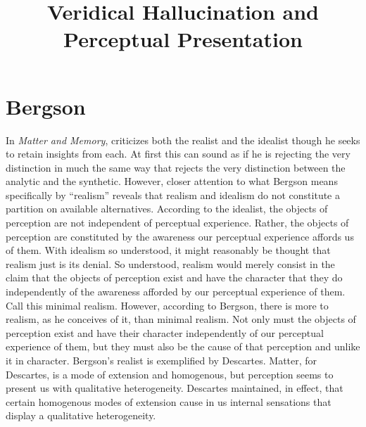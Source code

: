 \documentclass[12pt]{article}
\title{Veridical Hallucination and Perceptual Presentation}
\author{\myauthor}
\date{} %
\begin{document}
\maketitle

\setlength{\parindent}{1em}


\section{Bergson} %
\label{sec:bergson}

In \emph{Matter and Memory}, \citet{Bergson:1912pi} criticizes both the realist and the idealist though he seeks to retain insights from each. At first this can sound as if he is rejecting the very distinction in much the same way that \citet{Quine:1951fk} rejects the very distinction between the analytic and the synthetic. However, closer attention to what Bergson means specifically by ``realism'' reveals that realism and idealism do not constitute a partition on available alternatives. According to the idealist, the objects of perception are not independent of perceptual experience. Rather, the objects of perception are constituted by the awareness our perceptual experience affords us of them. With idealism so understood, it might reasonably be thought that realism just is its denial. So understood, realism would merely consist in the claim that the objects of perception exist and have the character that they do independently of the awareness afforded by our perceptual experience of them. Call this minimal realism. However, according to Bergson, there is more to realism, as he conceives of it, than minimal realism. Not only must the objects of perception exist and have their character independently of our perceptual experience of them, but they must also be the cause of that perception and unlike it in character. Bergson's realist is exemplified by Descartes. Matter, for Descartes, is a mode of extension and homogenous, but perception seems to present us with qualitative heterogeneity. Descartes maintained, in effect, that certain homogenous modes of extension cause in us internal sensations that display a qualitative heterogeneity. 
\end{document}
